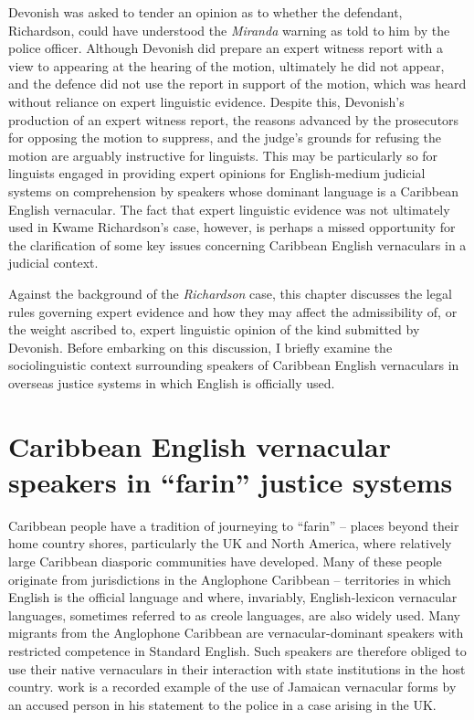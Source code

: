 \documentclass[output=paper,colorlinks,citecolor=brown]{langscibook}
\begin{document}
Devonish was asked to tender an opinion as to whether the defendant, Richardson, could have understood the \emph{Miranda} warning as told to him by the police officer. Although Devonish did prepare an expert witness report with a view to appearing at the hearing of the motion, ultimately he did not appear, and the defence did not use the report in support of the motion, which was heard without reliance on expert linguistic evidence. Despite this, Devonish’s production of an expert witness report, the reasons advanced by the prosecutors for opposing the motion to suppress, and the judge’s grounds for refusing the motion are arguably instructive for linguists. This may be particularly so for linguists engaged in providing expert opinions for English-medium judicial systems on comprehension by speakers whose dominant language is a Caribbean English vernacular. The fact that expert linguistic evidence was not ultimately used in Kwame Richardson's case, however, is perhaps a missed opportunity for the clarification of some key issues concerning Caribbean English vernaculars in a judicial context.

Against the background of the \emph{Richardson} case, this chapter discusses the legal rules governing expert evidence and how they may affect the admissibility of, or the weight ascribed to, expert linguistic opinion of the kind submitted by Devonish. Before embarking on this discussion, I briefly examine the sociolinguistic context surrounding speakers of Caribbean English vernaculars in overseas justice systems in which English is officially used.  


\section{Caribbean English vernacular speakers in “farin” justice systems}

Caribbean people have a tradition of journeying to “farin” -- places beyond their home country shores, particularly the UK and North America, where relatively large Caribbean diasporic communities have developed. Many of these people originate from jurisdictions in the Anglophone Caribbean -- territories in which English is the official language and where, invariably, English-lexicon vernacular languages, sometimes referred to as creole languages, are also widely used. Many migrants from the Anglophone Caribbean are vernacular-dominant speakers with restricted competence in Standard English.  Such speakers are therefore obliged to use their native vernaculars in their interaction with state institutions in the host country. \citet{Blackwell1996} work is a recorded example of the use of Jamaican vernacular forms by an accused person in his statement to the police in a case arising in the UK.
\end{document}
